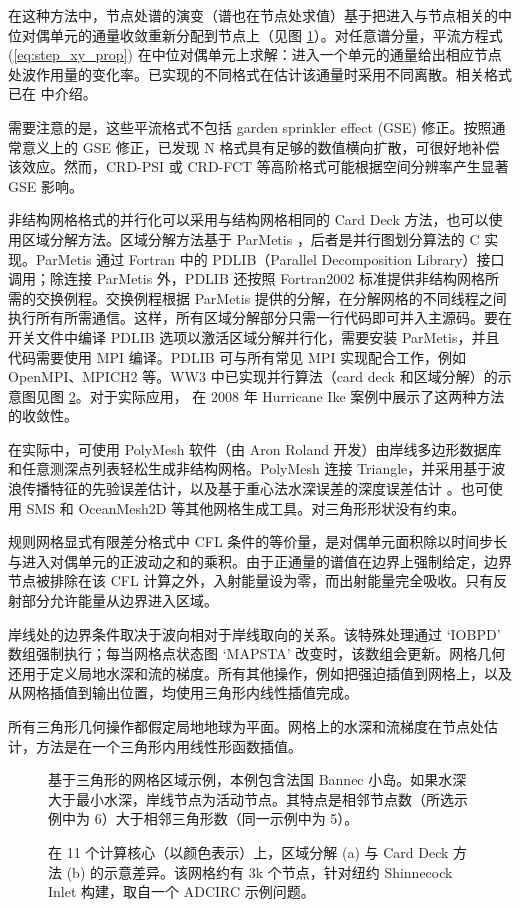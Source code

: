 在这种方法中，节点处谱的演变（谱也在节点处求值）基于把进入与节点相关的中位对偶单元的通量收敛重新分配到节点上（见图 \ref{fig:triangles}）。对任意谱分量，平流方程式 (\ref{eq:step_xy_prop}) 在中位对偶单元上求解：进入一个单元的通量给出相应节点处波作用量的变化率。已实现的不同格式在估计该通量时采用不同离散。相关格式已在 \citep[见][综述]{rep:Roland2008} 中介绍。

需要注意的是，这些平流格式不包括 garden sprinkler effect (GSE) 修正。按照通常意义上的 GSE 修正，已发现 N 格式具有足够的数值横向扩散，可很好地补偿该效应。然而，CRD-PSI 或 CRD-FCT 等高阶格式可能根据空间分辨率产生显著 GSE 影响。

非结构网格格式的并行化可以采用与结构网格相同的 Card Deck 方法，也可以使用区域分解方法。区域分解方法基于 ParMetis \citep{rep:karypis2011metis}，后者是并行图划分算法的 C 实现。ParMetis 通过 Fortran 中的 PDLIB（Parallel Decomposition Library）接口调用；除连接 ParMetis 外，PDLIB 还按照 Fortran2002 标准提供非结构网格所需的交换例程。交换例程根据 ParMetis 提供的分解，在分解网格的不同线程之间执行所有所需通信。这样，所有区域分解部分只需一行代码即可并入主源码。要在开关文件中编译 PDLIB 选项以激活区域分解并行化，需要安装 ParMetis，并且代码需要使用 MPI 编译。PDLIB 可与所有常见 MPI 实现配合工作，例如 OpenMPI、MPICH2 等。WW3 中已实现并行算法（card deck 和区域分解）的示意图见图 \ref{DDvsCD}。对于实际应用，\cite{AbdolaliEtAl2019OM} 在 2008 年 Hurricane Ike 案例中展示了这两种方法的收敛性。

在实际中，可使用 PolyMesh 软件（由 Aron Roland 开发）由岸线多边形数据库和任意测深点列表轻松生成非结构网格。PolyMesh 连接 Triangle，并采用基于波浪传播特征的先验误差估计，以及基于重心法水深误差的深度误差估计 \citep[e.g.][]{art:WS96}。也可使用 SMS 和 OceanMesh2D 等其他网格生成工具。对三角形形状没有约束。

规则网格显式有限差分格式中 CFL 条件的等价量，是对偶单元面积除以时间步长与进入对偶单元的正波动之和的乘积。由于正通量的谱值在边界上强制给定，边界节点被排除在该 CFL 计算之外，入射能量设为零，而出射能量完全吸收。只有反射部分允许能量从边界进入区域。

岸线处的边界条件取决于波向相对于岸线取向的关系。该特殊处理通过 `{\code IOBPD}' 数组强制执行；每当网格点状态图 `{\code MAPSTA}' 改变时，该数组会更新。网格几何还用于定义局地水深和流的梯度。所有其他操作，例如把强迫插值到网格上，以及从网格插值到输出位置，均使用三角形内线性插值完成。

所有三角形几何操作都假定局地地球为平面。网格上的水深和流梯度在节点处估计，方法是在一个三角形内用线性形函数插值。

\begin{figure} \begin{center}
\caption{基于三角形的网格区域示例，本例包含法国 Bannec 小岛。如果水深大于最小水深，岸线节点为活动节点。其特点是相邻节点数（所选示例中为 6）大于相邻三角形数（同一示例中为 5）。}
\label{fig:triangles} \botline
\end{center}
\end{figure}


\begin{figure} \begin{center}
\caption{在 11 个计算核心（以颜色表示）上，区域分解 (a) 与 Card Deck 方法 (b) 的示意差异。该网格约有 3k 个节点，针对纽约 Shinnecock Inlet 构建，取自一个 ADCIRC 示例问题。}
\label{DDvsCD} \botline
\end{center}
\end{figure}

